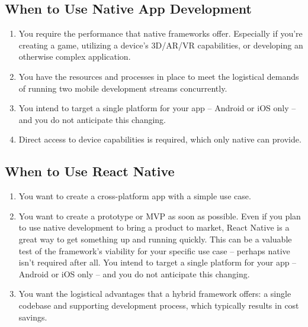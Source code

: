 \subsection{When to Use Native App Development}

\begin{enumerate}
  \item You require the performance that native frameworks offer.
  Especially if you're creating a game, utilizing a device's 3D/AR/VR capabilities, or developing an otherwise complex
  application.
  \item You have the resources and processes in place to meet the logistical demands of running two mobile development
  streams concurrently.
  \item You intend to target a single platform for your app – Android or iOS only – and you do not anticipate this
  changing.
  \item Direct access to device capabilities is required, which only native can provide.
\end{enumerate}

\subsection{When to Use React Native}

\begin{enumerate}
  \item You want to create a cross-platform app with a simple use case.
  \item You want to create a prototype or MVP as soon as possible.
  Even if you plan to use native development to bring a product to market, React Native is a great way to get
  something up and running quickly.
  This can be a valuable test of the framework's viability for your specific use case – perhaps native isn't required
  after all.
  You intend to target a single platform for your app – Android or iOS only – and you do not anticipate this changing.
  \item You want the logistical advantages that a hybrid framework offers: a single codebase and supporting
  development process, which typically results in cost savings.
\end{enumerate}
